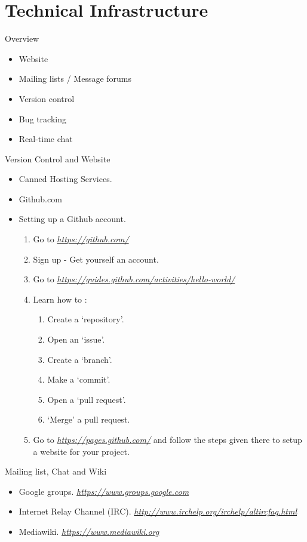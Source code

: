 \documentclass{beamer}
\begin{document}
\section{Technical Infrastructure}
\begin{frame}{Overview}
\begin{itemize}
	\item Website
	\item Mailing lists / Message forums
	\item Version control
	\item Bug tracking
	\item Real-time chat
\end{itemize}
\end{frame}

\begin{frame}{Version Control and Website}
\begin{itemize}
	\item Canned Hosting Services. 
	\item Github.com 
	\item Setting up a Github account. 
	\begin{enumerate} 
			\item Go to \emph{\href{https://github.com/}{https://github.com/}} 
			\item Sign up - Get yourself an account. 
			\item Go to \emph{\href{https://guides.github.com/activities/hello-world/}{https://guides.github.com/activities/hello-world/}} 
			\item Learn how to :
			\begin{enumerate}
				\item Create a `repository'.
				\item Open an `issue'.
				\item Create a `branch'.
				\item Make a `commit'.
				\item Open a `pull request'.
				\item `Merge' a pull request.
			\end{enumerate}
			\item Go to \emph{\href{https://pages.github.com/}{https://pages.github.com/}}  and follow the steps given there to setup a website for your project.
	\end{enumerate}
\end{itemize}
\end{frame}

\begin{frame}{Mailing list, Chat and Wiki}
\begin{itemize}
	\item Google groups. \emph{\href{https://groups.google.com}{https://www.groups.google.com}}
	\item Internet Relay Channel (IRC). \emph{\href{http://www.irchelp.org/irchelp/altircfaq.html}{http://www.irchelp.org/irchelp/altircfaq.html}}
	\item Mediawiki. \emph{\href{https://www.mediawiki.org}{https://www.mediawiki.org}}
\end{itemize}
\end{frame}
\end{document}
